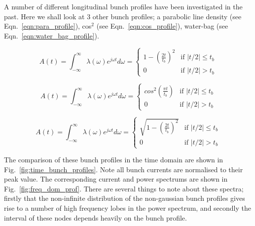 \documentclass[12pt,a4paper,twopage,openright]{report}
\begin{document}
A number of different longitudinal bunch profiles have been investigated in the past. Here we shall look at 3 other bunch profiles; a parabolic line density (see Eqn.~\ref{eqn:para_profile}), cos$^{2}$ (see Eqn.~\ref{eqn:cos_profile}), water-bag (see Eqn.~\ref{eqn:water_bag_profile}).

\begin{equation}
A\left( t \right) = \int^{\infty}_{-\infty} \lambda \left( \omega \right) e^{j\omega t} d\omega = 
\begin{cases}1-\left( \frac{2t} {t_{b}} \right)^{2} &\textrm{if $| t/2 | \leq t_{b}$}\\
0								&\textrm{if $| t/2 | > t_{b}$}
\end{cases}
\label{eqn:para_profile}
\end{equation}

\begin{equation}
A\left( t \right) = \int^{\infty}_{-\infty} \lambda \left( \omega \right) e^{j\omega t} d\omega = 
\begin{cases}
cos^{2}\left( \frac{\pi t} {t_{b}} \right) &\textrm{if $| t/2 | \leq t_{b}$}\\
0								&\textrm{if $| t/2 | > t_{b}$}
\end{cases}
\label{eqn:cos_profile}
\end{equation}

\begin{equation}
A\left( t \right) = \int^{\infty}_{-\infty} \lambda \left( \omega \right) e^{j\omega t} d\omega = 
\begin{cases}
\sqrt{1-\left( \frac{2t}{t_{b}}\right)^{2}} &\textrm{if $| t/2 | \leq t_{b}$}\\
0								&\textrm{if $| t/2 | > t_{b}$}
\end{cases}
\label{eqn:water_bag_profile}
\end{equation}

The comparison of these bunch profiles in the time domain are shown in Fig.~\ref{fig:time_bunch_profiles}. Note all bunch currents are normalised to their peak value. The corresponding current and power spectrums are shown in Fig.~\ref{fig:freq_dom_prof}. There are several things to note about these spectra; firstly that the non-infinite distribution of the non-gaussian bunch profiles gives rise to a number of high frequency lobes in the power spectrum, and secondly the interval of these nodes depends heavily on the bunch profile.
\end{document}

